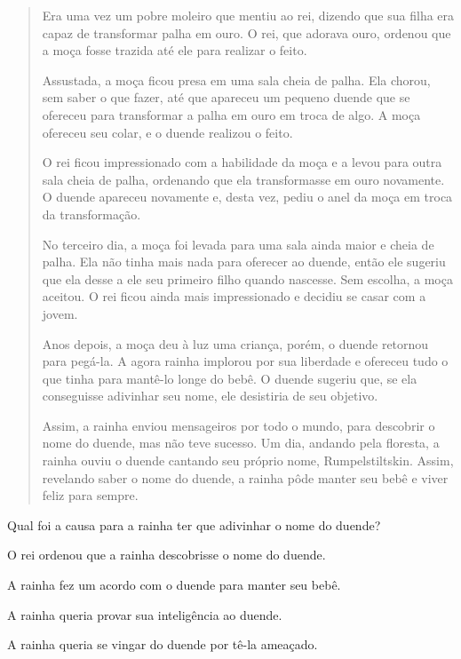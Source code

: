 \begin{quote}
Era uma vez um pobre moleiro que mentiu ao rei, dizendo que sua filha
era capaz de transformar palha em ouro. O rei, que adorava ouro, ordenou
que a moça fosse trazida até ele para realizar o feito.

Assustada, a moça ficou presa em uma sala cheia de palha. Ela chorou,
sem saber o que fazer, até que apareceu um pequeno duende que se
ofereceu para transformar a palha em ouro em troca de algo. A moça
ofereceu seu colar, e o duende realizou o feito.

O rei ficou impressionado com a habilidade da moça e a levou para outra
sala cheia de palha, ordenando que ela transformasse em ouro novamente.
O duende apareceu novamente e, desta vez, pediu o anel da moça em troca
da transformação.

No terceiro dia, a moça foi levada para uma sala ainda maior e cheia de
palha. Ela não tinha mais nada para oferecer ao duende, então ele
sugeriu que ela desse a ele seu primeiro filho quando nascesse. Sem
escolha, a moça aceitou. O rei ficou ainda mais impressionado e decidiu
se casar com a jovem.

Anos depois, a moça deu à luz uma criança, porém, o duende retornou para
pegá-la. A agora rainha implorou por sua liberdade e ofereceu tudo o que
tinha para mantê-lo longe do bebê. O duende sugeriu que, se ela
conseguisse adivinhar seu nome, ele desistiria de seu objetivo.

Assim, a rainha enviou mensageiros por todo o mundo, para descobrir o
nome do duende, mas não teve sucesso. Um dia, andando pela floresta, a
rainha ouviu o duende cantando seu próprio nome, Rumpelstiltskin. Assim,
revelando saber o nome do duende, a rainha pôde manter seu bebê e viver
feliz para sempre.
\end{quote}

Qual foi a causa para a rainha ter que adivinhar o nome do duende?

\begin{escolha}
\item O rei ordenou que a rainha descobrisse o nome do duende.

\item A rainha fez um acordo com o duende para manter seu bebê.

\item A rainha queria provar sua inteligência ao duende.

\item A rainha queria se vingar do duende por tê-la ameaçado.
\end{escolha}

